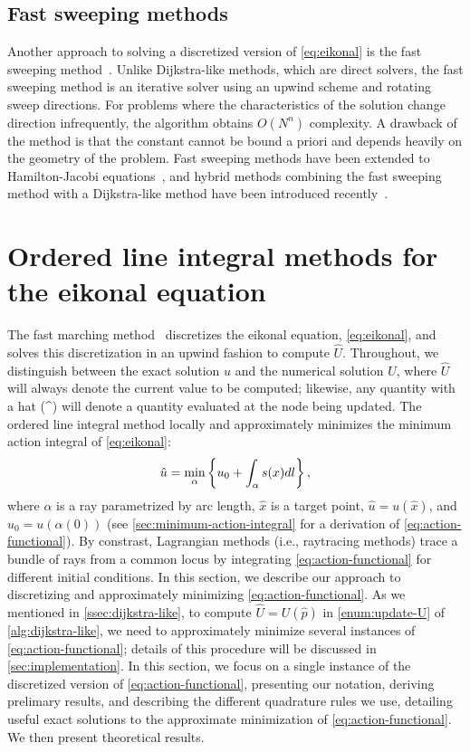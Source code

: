 \documentclass{article}
\begin{document}
\subsection{Fast sweeping methods} Another approach to solving a
discretized version of \cref{eq:eikonal} is the fast sweeping
method~\cite{tsai2003fast,zhao2005fast}. Unlike Dijkstra-like methods,
which are direct solvers, the fast sweeping method is an iterative
solver using an upwind scheme and rotating sweep directions. For
problems where the characteristics of the solution change direction
infrequently, the algorithm obtains $O(N^n)$ complexity. A drawback of
the method is that the constant cannot be bound a priori and depends
heavily on the geometry of the problem. Fast sweeping methods have
been extended to Hamilton-Jacobi
equations~\cite{tsai2003fast,kao2008legendre}, and hybrid methods
combining the fast sweeping method with a Dijkstra-like method have
been introduced recently~\cite{chacon2012fast,chacon2015parallel}.

\section{Ordered line integral methods for the eikonal equation}

The fast marching method~\cite{sethian1996fast} discretizes the
eikonal equation, \cref{eq:eikonal}, and solves this discretization in
an upwind fashion to compute $\hat{U}$. Throughout, we distinguish
between the exact solution $u$ and the numerical solution $U$, where
$\hat{U}$ will always denote the current value to be computed;
likewise, any quantity with a hat (\^{}) will denote a quantity
evaluated at the node being updated. The ordered line integral method
locally and approximately minimizes the minimum action integral of
\cref{eq:eikonal}:
\begin{equation}
  \label{eq:action-functional}
  \hat{u} = \min_{\alpha} \left\{u_0 + \int_\alpha s(x) dl\right\},
\end{equation}
where $\alpha$ is a ray parametrized by arc length, $\hat{x}$ is a
target point, $\hat{u} = u(\hat{x})$, and $u_0 = u(\alpha(0))$ (see
\cref{sec:minimum-action-integral} for a derivation of
\cref{eq:action-functional}). By constrast, Lagrangian methods (i.e.,
raytracing methods) trace a bundle of rays from a common locus by
integrating \cref{eq:action-functional} for different initial
conditions. In this section, we describe our approach to discretizing
and approximately minimizing \cref{eq:action-functional}. As we
mentioned in \cref{ssec:dijkstra-like}, to compute
$\hat{U} = U(\hat{p})$ in \cref{enum:update-U} of
\cref{alg:dijkstra-like}, we need to approximately minimize several
instances of \cref{eq:action-functional}; details of this procedure
will be discussed in \cref{sec:implementation}. In this section, we
focus on a single instance of the discretized version of
\cref{eq:action-functional}, presenting our notation, deriving
prelimary results, and describing the different quadrature rules we
use, detailing useful exact solutions to the approximate minimization
of \cref{eq:action-functional}. We then present theoretical results.
\end{document}
